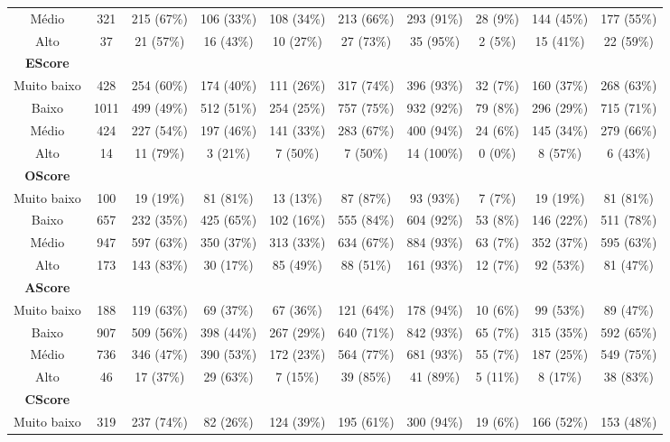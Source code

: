 \begin{landscape}
\begin{table}[h!]
\begin{tabular}{cccccccccc}
Médio & 321 & 215 (67\%) & 106 (33\%) & 108 (34\%) & 213 (66\%) & 293 (91\%) & 28 (9\%) & 144 (45\%) & 177 (55\%) \\
Alto & 37 & 21 (57\%) & 16 (43\%) & 10 (27\%) & 27 (73\%) & 35 (95\%) & 2 (5\%) & 15 (41\%) & 22 (59\%) \\ \hline
\textbf{EScore} &  &  &  &  &  &  &  &  &  \\
Muito baixo & 428 & 254 (60\%) & 174 (40\%) & 111 (26\%) & 317 (74\%) & 396 (93\%) & 32 (7\%) & 160 (37\%) & 268 (63\%) \\
Baixo & 1011 & 499 (49\%) & 512 (51\%) & 254 (25\%) & 757 (75\%) & 932 (92\%) & 79 (8\%) & 296 (29\%) & 715 (71\%) \\
Médio & 424 & 227 (54\%) & 197 (46\%) & 141 (33\%) & 283 (67\%) & 400 (94\%) & 24 (6\%) & 145 (34\%) & 279 (66\%) \\
Alto & 14 & 11 (79\%) & 3 (21\%) & 7 (50\%) & 7 (50\%) & 14 (100\%) & 0 (0\%) & 8 (57\%) & 6 (43\%) \\ \hline
\textbf{OScore} &  &  &  &  &  &  &  &  &  \\
Muito baixo & 100 & 19 (19\%) & 81 (81\%) & 13 (13\%) & 87 (87\%) & 93 (93\%) & 7 (7\%) & 19 (19\%) & 81 (81\%) \\
Baixo & 657 & 232 (35\%) & 425 (65\%) & 102 (16\%) & 555 (84\%) & 604 (92\%) & 53 (8\%) & 146 (22\%) & 511 (78\%) \\
Médio & 947 & 597 (63\%) & 350 (37\%) & 313 (33\%) & 634 (67\%) & 884 (93\%) & 63 (7\%) & 352 (37\%) & 595 (63\%) \\
Alto & 173 & 143 (83\%) & 30 (17\%) & 85 (49\%) & 88 (51\%) & 161 (93\%) & 12 (7\%) & 92 (53\%) & 81 (47\%) \\ \hline
\textbf{AScore} &  &  &  &  &  &  &  &  &  \\
Muito baixo & 188 & 119 (63\%) & 69 (37\%) & 67 (36\%) & 121 (64\%) & 178 (94\%) & 10 (6\%) & 99 (53\%) & 89 (47\%) \\
Baixo & 907 & 509 (56\%) & 398 (44\%) & 267 (29\%) & 640 (71\%) & 842 (93\%) & 65 (7\%) & 315 (35\%) & 592 (65\%) \\
Médio & 736 & 346 (47\%) & 390 (53\%) & 172 (23\%) & 564 (77\%) & 681 (93\%) & 55 (7\%) & 187 (25\%) & 549 (75\%) \\
Alto & 46 & 17 (37\%) & 29 (63\%) & 7 (15\%) & 39 (85\%) & 41 (89\%) & 5 (11\%) & 8 (17\%) & 38 (83\%) \\ \hline
\textbf{CScore} &  &  &  &  &  &  &  &  &  \\
Muito baixo & 319 & 237 (74\%) & 82 (26\%) & 124 (39\%) & 195 (61\%) & 300 (94\%) & 19 (6\%) & 166 (52\%) & 153 (48\%) \\

\end{tabular}
\end{table}
\end{landscape}

